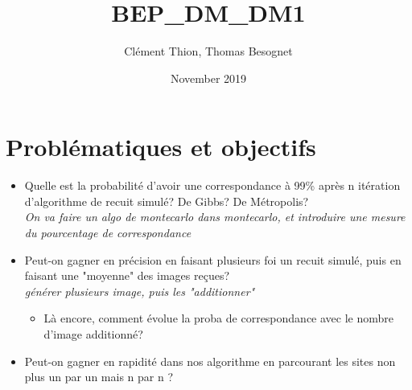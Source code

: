 \documentclass[fleqn]{article} %
\title{BEP\_DM\_DM1}
\author{Clément Thion, Thomas Besognet}
\date{November 2019}
\begin{document}
\maketitle

\section{Problématiques et objectifs}

\begin{itemize}
	\item Quelle est la probabilité d'avoir une correspondance à 99\% après n itération d'algorithme de recuit simulé? De Gibbs? De Métropolis? \\
		\textit{On va faire un algo de montecarlo dans montecarlo, et introduire une mesure du pourcentage de correspondance}
	\item Peut-on gagner en précision en faisant plusieurs foi un recuit simulé, puis en faisant une "moyenne" des images reçues?\\
		\textit{générer plusieurs image, puis les "additionner"}\\
		\begin{itemize} \item Là encore, comment évolue la proba de correspondance avec le nombre d'image additionné?	\end{itemize}
	\item Peut-on gagner en rapidité dans nos algorithme en parcourant les sites non plus un par un mais n par n ?
\end{itemize}
\end{document}

